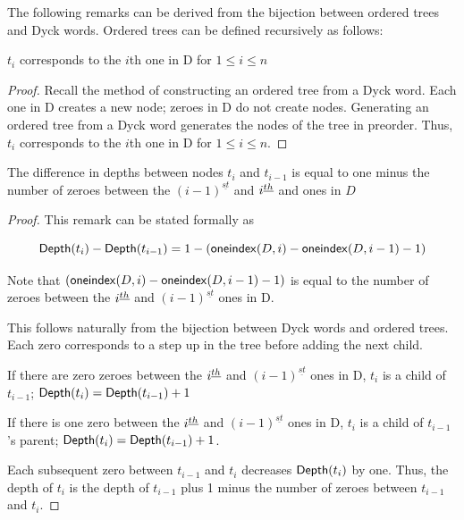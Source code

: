 The following remarks can be derived from the bijection between ordered trees and Dyck words. Ordered trees can be defined recursively as follows: 


\begin{remark}
    $t_i$ corresponds to the $i$th one in D for $1 \le i \le n$
\end{remark}
\begin{proof}
    Recall the method of constructing an ordered tree from a Dyck word.  Each one in D creates a new node; zeroes in D do not create nodes.  Generating an ordered tree from a Dyck word generates the nodes of the tree in preorder.  Thus, $t_i$ corresponds to the $i$th one in D for $1 \le i \le n$.
\end{proof}

\begin{remark} The difference in depths between nodes $t_i$ and $t_{i-1}$ is equal to one minus the number of zeroes between the $(i-1)^{\underline{st}}$ and $i^{\underline{th}}$ and  ones in $D$


\end{remark}
\begin{proof}

    This remark can be stated formally as 

    \begin{equation} \label{eq:depthformula} 
    	\mathsf{Depth}{(t_i)} - \mathsf{Depth}{(t_{i-1})}=1-(\mathsf{oneindex}({D}, i)-\mathsf{oneindex}({D}, i-1) - 1) 
    \end{equation}
    


    

    Note that $(\mathsf{oneindex}({D}, i)-\mathsf{oneindex}({D}, i-1)-1)$ is equal to the number of zeroes between the $i^{\underline{th}}$ and $(i-1)^{\underline{st}}$ ones in D.  %



    This follows naturally from the bijection between Dyck words and ordered trees.  Each zero corresponds to a step up in the tree before adding the next child.  

    If there are zero zeroes between the $i^{\underline{th}}$  and $(i-1)^{\underline{st}}$ ones in D, $t_i$ is a child of $t_{i-1}$; $\mathsf{Depth}{(t_i)}=\mathsf{Depth}{(t_{i-1})}+1$

    If there is one zero between the $i^{\underline{th}}$  and $(i-1)^{\underline{st}}$ ones in D, $t_i$ is a child of $t_{i-1}$'s parent; $\mathsf{Depth}{(t_i)}=\mathsf{Depth}{(t_{i-1})}+1$.  

    Each subsequent zero between $t_{i-1}$ and $t_i$ decreases $\mathsf{Depth}{(t_{i})}$ by one.  Thus, the depth of $t_i$ is the depth of $t_{i-1}$ plus 1 minus the number of zeroes between $t_{i-1}$ and $t_{i}$.
\end{proof}
